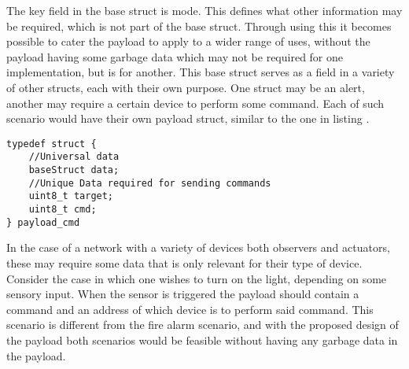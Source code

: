 The key field in the base struct is mode.
This defines what other information may be required, which is not part of the base struct.
Through using this it becomes possible to cater the payload to apply to a wider range of uses, without the payload having some garbage data which may not be required for one implementation, but is for another.
This base struct serves as a field in a variety of other structs, each with their own purpose.
One struct may be an alert, another may require a certain device to perform some command.
Each of such scenario would have their own payload struct, similar to the one in listing .

\bigskip \noindent
\begin{lstlisting}[style=customc,caption={A possible way a struct for designating commands could look in the payload},label={cmdStruct}]
typedef struct { 
    //Universal data
    baseStruct data;
    //Unique Data required for sending commands
    uint8_t target;
    uint8_t cmd;
} payload_cmd
\end{lstlisting}
\bigskip \noindent

In the case of a network with a variety of devices both observers and actuators, these may require some data that is only relevant for their type of device.
Consider the case in which one wishes to turn on the light, depending on some sensory input.
When the sensor is triggered the payload should contain a command and an address of which device is to perform said command.
This scenario is different from the fire alarm scenario, and with the proposed design of the payload both scenarios would be feasible without having any garbage data in the payload.
